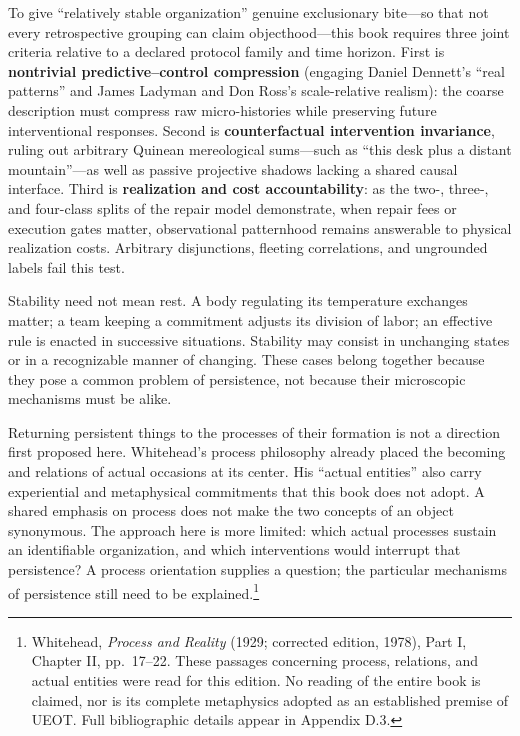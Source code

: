 \documentclass[
  english,
  11pt,
  oneside]{book}
\begin{document}
To give ``relatively stable organization'' genuine exclusionary bite---so that not every retrospective grouping can claim objecthood---this book requires three joint criteria relative to a declared protocol family and time horizon. First is \textbf{nontrivial predictive--control compression} (engaging Daniel Dennett's ``real patterns'' and James Ladyman and Don Ross's scale-relative realism): the coarse description must compress raw micro-histories while preserving future interventional responses. Second is \textbf{counterfactual intervention invariance}, ruling out arbitrary Quinean mereological sums---such as ``this desk plus a distant mountain''---as well as passive projective shadows lacking a shared causal interface. Third is \textbf{realization and cost accountability}: as the two-, three-, and four-class splits of the repair model demonstrate, when repair fees or execution gates matter, observational patternhood remains answerable to physical realization costs. Arbitrary disjunctions, fleeting correlations, and ungrounded labels fail this test.

Stability need not mean rest. A body regulating its temperature exchanges matter; a team keeping a commitment adjusts its division of labor; an effective rule is enacted in successive situations. Stability may consist in unchanging states or in a recognizable manner of changing. These cases belong together because they pose a common problem of persistence, not because their microscopic mechanisms must be alike.

Returning persistent things to the processes of their formation is not a direction first proposed here. Whitehead's process philosophy already placed the becoming and relations of actual occasions at its center. His ``actual entities'' also carry experiential and metaphysical commitments that this book does not adopt. A shared emphasis on process does not make the two concepts of an object synonymous. The approach here is more limited: which actual processes sustain an identifiable organization, and which interventions would interrupt that persistence? A process orientation supplies a question; the particular mechanisms of persistence still need to be explained.\footnote{\hypertarget{ph-note-6}{}Whitehead, \emph{Process and Reality} (1929; corrected edition, 1978), Part I, Chapter II, pp.~17--22. These passages concerning process, relations, and actual entities were read for this edition. No reading of the entire book is claimed, nor is its complete metaphysics adopted as an established premise of UEOT. Full bibliographic details appear in Appendix D.3.}
\end{document}
